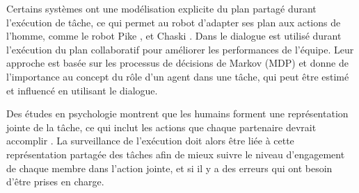 \documentclass[a4paper,11pt,twoside]{StyleThese}
\begin{document}


Certains systèmes ont une modélisation explicite du plan partagé durant l'exécution de tâche, ce qui permet au robot d'adapter ses plan aux actions de l'homme, comme le robot Pike
\cite{levine2014concurrent,karpas2015robust}, et Chaski \cite{shah2011improved}.
Dans \cite{clair2015robot} le dialogue est utilisé durant l'exécution du plan collaboratif pour améliorer les performances de l'équipe. Leur approche est basée sur les processus de décisions de Markov (MDP) et donne de l'importance au concept du rôle d'un agent dans une tâche, qui peut être estimé et influencé en utilisant le dialogue.

Des études en psychologie montrent que les humains forment une représentation jointe de la tâche, ce qui inclut les actions que chaque partenaire devrait accomplir \cite{sebanz2006joint}. La surveillance de l'exécution doit alors être liée à cette représentation partagée des tâches afin de mieux suivre le niveau d'engagement de chaque membre dans l'action jointe, et si il y a des erreurs qui ont besoin d'être prises en charge.






 


\end{document}
